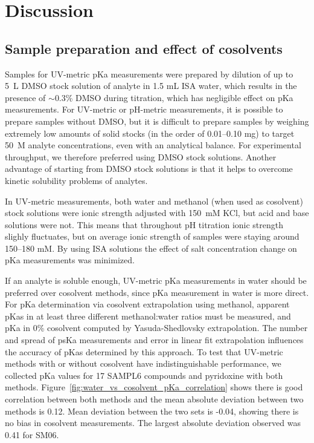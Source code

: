 \documentclass[9pt,lineno]{elife}
\begin{document}
\section{Discussion}

\subsection{Sample preparation and effect of cosolvents}

Samples for UV-metric pKa measurements were prepared by dilution of up to 5~\micro L DMSO stock solution of analyte in 1.5 mL ISA water, which results in the presence of $\sim$0.3\% DMSO during titration, which has negligible effect on pKa measurements. 
For UV-metric or pH-metric measurements, it is possible to prepare samples without DMSO, but it is difficult to prepare samples by weighing extremely low amounts of solid stocks (in the order of 0.01--0.10 mg) to target 50~{\micro}M analyte concentrations, even with an analytical balance. 
For experimental throughput, we therefore preferred using DMSO stock solutions. 
Another advantage of starting from DMSO stock solutions is that it helps to overcome kinetic solubility problems of analytes.

In UV-metric measurements, both water and methanol (when used as cosolvent) stock solutions were ionic strength adjusted with 150~mM KCl, but acid and base solutions were not. This means that throughout pH titration ionic strength slighly fluctuates, but on average ionic strength of samples were staying around 150--180 mM. By using ISA solutions the effect of salt concentration change on pKa measurements was minimized.

If an analyte is soluble enough, UV-metric pKa measurements in water should be preferred over cosolvent methods, since pKa measurement in water is more direct. 
For pKa determination via cosolvent extrapolation using methanol, apparent pKas in at least three different methanol:water ratios must be measured, and pKa in 0\% cosolvent computed by Yasuda-Shedlovsky extrapolation. 
The number and spread of psKa measurements and error in linear fit extrapolation influences the accuracy of pKas determined by this approach. 
To test that UV-metric methods with or without cosolvent have indistinguishable performance, we collected pKa values for 17 SAMPL6 compounds and pyridoxine with both methods. 
Figure~\ref{fig:water_vs_cosolvent_pKa_correlation} shows there is good correlation between both methods and the mean absolute deviation between two methods is 0.12. Mean deviation between the two sets is -0.04, showing there is no bias in cosolvent measurements. The largest absolute deviation observed was 0.41 for SM06. 
\end{document}
